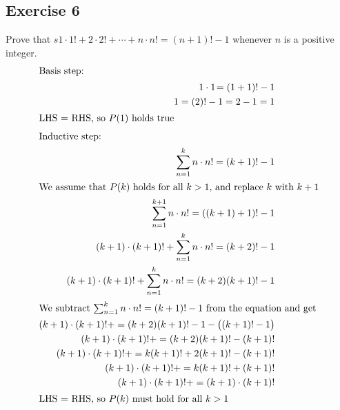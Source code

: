 \documentclass[12pt]{article}
\begin{document}
    \subsection{Exercise 6}
    Prove that $s1 \cdot 1!+2 \cdot 2! + \cdots + n \cdot n! = (n+1)!-1$ whenever $n$ is a positive integer.
    \begin{align}
        \intertext{Basis step:}
        1\cdot 1\! = (1 + 1)! - 1 \\
        1 = (2)! - 1 = 2 - 1 = 1\\
        \intertext{LHS = RHS, so $P(1)$ holds true}
        \intertext{Inductive step:}
        \sum_{n = 1}^k{n\cdot n!} = (k + 1)! - 1 \\ %
        \intertext{We assume that $P(k)$ holds for all $k > 1$, and replace
            $k$ with $k+1$}
        \sum_{n = 1}^{k+1}{n\cdot n!} = ((k+1) + 1)! - 1 \\
        (k+1)\cdot(k+1)! + \sum_{n = 1}^{k}{n\cdot n!}  = (k+2)! - 1 \\
        (k+1)\cdot(k+1)! + \sum_{n = 1}^{k}{n\cdot n!}  = (k+2)(k+1)! - 1 \\
        \intertext{We subtract $\sum_{n = 1}^k{n\cdot n!} = (k + 1)! - 1$ from the equation and get}
        (k+1)\cdot(k+1)! +  = (k+2)(k+1)! - 1 - \big( (k+1)! - 1\big)\\
        (k+1)\cdot(k+1)! +  = (k+2)(k+1)!  -  (k+1)! \\
        (k+1)\cdot(k+1)! +  = k(k+1)! + 2(k+1)! - (k+1)! \\
        (k+1)\cdot(k+1)! +  = k(k+1)! + (k+1)!  \\
        (k+1)\cdot(k+1)! +  = (k+1)\cdot(k+1)!  \\
        \intertext{LHS = RHS, so $P(k)$ must hold for all $k > 1$}
    \end{align}
\end{document}
